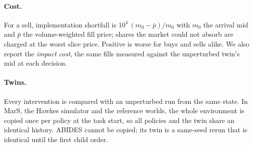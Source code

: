 \paragraph{Cost.} For a sell, implementation shortfall is $10^4\,(m_0 - \bar p)/m_0$ with $m_0$ the arrival mid and $\bar p$ the volume-weighted fill price; shares the market could not absorb are charged at the worst slice price. Positive is worse for buys and sells alike. We also report the \emph{impact cost}, the same fills measured against the unperturbed twin's mid at each decision.

\paragraph{Twins.} Every intervention is compared with an unperturbed run from the same state. In MarS, the Hawkes simulator and the reference worlds, the whole environment is copied once per policy at the task start, so all policies and the twin share an identical history. ABIDES cannot be copied; its twin is a same-seed rerun that is identical until the first child order.

